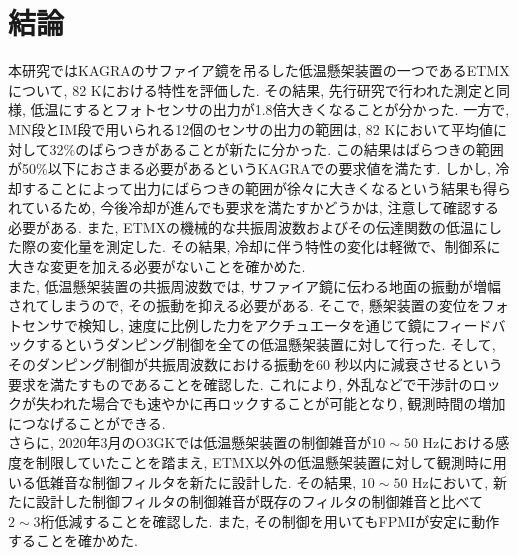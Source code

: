 \section{結論}
本研究ではKAGRAのサファイア鏡を吊るした低温懸架装置の一つであるETMXについて, 82 Kにおける特性を評価した. その結果, 先行研究で行われた測定と同様, 低温にするとフォトセンサの出力が1.8倍大きくなることが分かった. 一方で, MN段とIM段で用いられる12個のセンサの出力の範囲は, 82 Kにおいて平均値に対して32\%のばらつきがあることが新たに分かった. この結果はばらつきの範囲が50\%以下におさまる必要があるというKAGRAでの要求値を満たす. しかし, 冷却することによって出力にばらつきの範囲が徐々に大きくなるという結果も得られているため, 今後冷却が進んでも要求を満たすかどうかは, 注意して確認する必要がある. また, ETMXの機械的な共振周波数およびその伝達関数の低温にした際の変化量を測定した. その結果, 冷却に伴う特性の変化は軽微で、制御系に大きな変更を加える必要がないことを確かめた.\\
\quad また, 低温懸架装置の共振周波数では, サファイア鏡に伝わる地面の振動が増幅されてしまうので, その振動を抑える必要がある. そこで, 懸架装置の変位をフォトセンサで検知し, 速度に比例した力をアクチュエータを通じて鏡にフィードバックするというダンピング制御を全ての低温懸架装置に対して行った. そして, そのダンピング制御が共振周波数における振動を60 秒以内に減衰させるという要求を満たすものであることを確認した. これにより, 外乱などで干渉計のロックが失われた場合でも速やかに再ロックすることが可能となり, 観測時間の増加につなげることができる.\\
\quad さらに, 2020年3月のO3GKでは低温懸架装置の制御雑音が$10\sim50$ Hzにおける感度を制限していたことを踏まえ, ETMX以外の低温懸架装置に対して観測時に用いる低雑音な制御フィルタを新たに設計した. その結果, $10\sim50$ Hzにおいて, 新たに設計した制御フィルタの制御雑音が既存のフィルタの制御雑音と比べて$2\sim3$桁低減することを確認した. また, その制御を用いてもFPMIが安定に動作することを確かめた.
